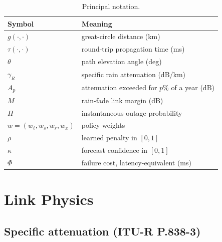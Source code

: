 \documentclass[10pt,twocolumn]{article}
\begin{document}
\begin{table}[t]
\centering
\caption{Principal notation.}
\label{tab:notation}
\small
\begin{tabularx}{\columnwidth}{@{}lX@{}}
\toprule
Symbol & Meaning \\
\midrule
$g(\cdot,\cdot)$ & great-circle distance (km) \\
$\tau(\cdot,\cdot)$ & round-trip propagation time (ms) \\
$\theta$ & path elevation angle (deg) \\
$\gamma_{R}$ & specific rain attenuation (dB/km) \\
$A_{p}$ & attenuation exceeded for $p\%$ of a year (dB) \\
$M$ & rain-fade link margin (dB) \\
$\Pi$ & instantaneous outage probability \\
$w=(w_{\ell},w_{s},w_{r},w_{x})$ & policy weights \\
$\rho$ & learned penalty in $[0,1]$ \\
$\kappa$ & forecast confidence in $[0,1]$ \\
$\Phi$ & failure cost, latency-equivalent (ms) \\
\bottomrule
\end{tabularx}
\end{table}

\section{Link Physics}
\label{sec:physics}

\subsection{Specific attenuation (ITU-R P.838-3)}
\end{document}

